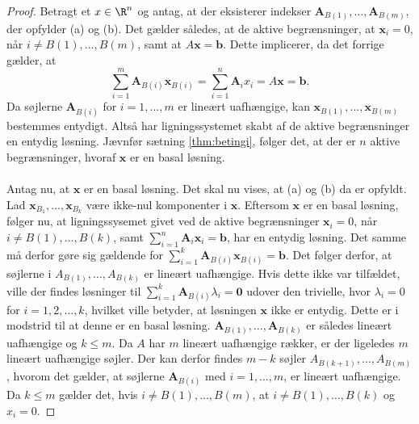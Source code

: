 \begin{proof}
Betragt et $x \in \R^n$ og antag, at der eksisterer indekser $\mathbf{A}_{B(1)},\ldots,\mathbf{A}_{B(m)}$, der opfylder (a) og (b).
%
Det gælder således, at de aktive begrænsninger, at $\textbf{x}_i=0$, når $i\neq B(1),\ldots,B(m)$, samt at $A\textbf{x}=\mathbf{b}$.
Dette implicerer, da det forrige gælder,  at 
%
$$\sum_{i=1}^{m}\textbf{A}_{B(i)}\textbf{x}_{B(i)}=\sum_{i=1}^{n}\textbf{A}_ix_i=A\textbf{x}=\textbf{b}.$$
%
Da søjlerne $\textbf{A}_{B(i)}$ for $i=1,\ldots,m$ er lineært uafhængige, kan $\textbf{x}_{B(1)},\ldots,\textbf{x}_{B(m)}$ bestemmes entydigt. 
Altså har ligningssystemet skabt af de aktive begrænsninger en entydig løsning.
Jævnfør sætning \ref{thm:betingi},
følger det, at der er $n$ aktive begrænsninger, hvoraf $\mathbf{x}$ er en basal løsning. 
\\\\
%
%
Antag nu, at $\mathbf{x}$ er en basal løsning. 
Det skal nu vises, at (a) og (b) da er opfyldt.
Lad $\textbf{x}_{B_1},\ldots,\textbf{x}_{B_k}$ være ikke-nul komponenter i $\textbf{x}$.
Eftersom $\mathbf{x}$ er en basal løsning, følger nu, at ligningssysemet givet ved de aktive begrænsninger $\textbf{x}_i=0$, når $i\neq B(1),\ldots,B(k)$, samt  $\sum_{i=1}^{n}\mathbf{A}_i\textbf{x}_i=\mathbf{b}$, har en entydig løsning. 
Det samme må derfor gøre sig gældende for $\sum_{i=1}^{k}\mathbf{A}_{B(i)}\textbf{x}_{B(i)}=\mathbf{b}$.
Det følger derfor, at søjlerne i $A_{B(1)},\ldots,A_{B(k)}$ er lineært uafhængige.
%
Hvis dette ikke var tilfældet, ville der findes løsninger til $\sum_{i=1}^{k}\mathbf{A}_{B(i)} \lambda_i=\mathbf{0}$ udover den trivielle, hvor $\lambda_i=0$ for $i=1,2,\ldots,k$, hvilket ville betyder, at løsningen $\mathbf{x}$ ikke er entydig. 
Dette er i modstrid til at denne er en basal løsning.
$\mathbf{A}_{B(1)},\ldots ,\mathbf{A}_{B(k)}$ er således lineært uafhængige og $k \leq m$.
Da $A$ har $m$ lineært uafhængige rækker, er der ligeledes $m$ lineært uafhængige søjler.
Der kan derfor findes $m-k$ søjler $A_{B(k+1)},\ldots,A_{B(m)}$, hvorom det gælder, at søjlerne $\mathbf{A}_{B(i)}$ med $i=1,\ldots,m$, er lineært uafhængige.
Da $k \leq m$ gælder det, hvis $i \neq B(1),\ldots,B(m)$, at $i \neq B(1),\ldots,B(k)$ og $x_i=0$.
%
\end{proof}
\\
